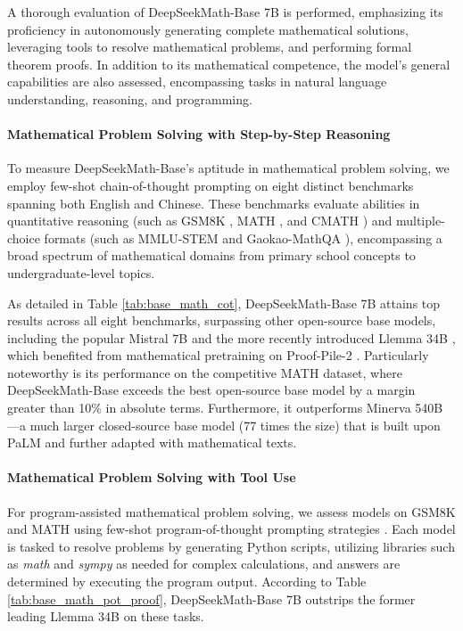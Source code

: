 A thorough evaluation of DeepSeekMath-Base 7B is performed, emphasizing its proficiency in autonomously generating complete mathematical solutions, leveraging tools to resolve mathematical problems, and performing formal theorem proofs. In addition to its mathematical competence, the model’s general capabilities are also assessed, encompassing tasks in natural language understanding, reasoning, and programming.

\paragraph{Mathematical Problem Solving with Step-by-Step Reasoning}

To measure DeepSeekMath-Base's aptitude in mathematical problem solving, we employ few-shot chain-of-thought prompting \citep{cot} on eight distinct benchmarks spanning both English and Chinese. These benchmarks evaluate abilities in quantitative reasoning (such as GSM8K \citep{gsm8k}, MATH \citep{MATH}, and CMATH \citep{wei2023cmath}) and multiple-choice formats (such as MMLU-STEM \citep{mmlu} and Gaokao-MathQA \citep{agieval}), encompassing a broad spectrum of mathematical domains from primary school concepts to undergraduate-level topics.

As detailed in Table \ref{tab:base_math_cot}, DeepSeekMath-Base 7B attains top results across all eight benchmarks, surpassing other open-source base models, including the popular Mistral 7B \citep{mistral} and the more recently introduced Llemma 34B \citep{llemma}, which benefited from mathematical pretraining on Proof-Pile-2 \citep{llemma}. Particularly noteworthy is its performance on the competitive MATH dataset, where DeepSeekMath-Base exceeds the best open-source base model by a margin greater than 10\% in absolute terms. Furthermore, it outperforms Minerva 540B \citep{minerva}—a much larger closed-source base model (77 times the size) that is built upon PaLM \citep{palm} and further adapted with mathematical texts.

\paragraph{Mathematical Problem Solving with Tool Use}  
For program-assisted mathematical problem solving, we assess models on GSM8K and MATH using few-shot program-of-thought prompting strategies \citep{pot,pal}. Each model is tasked to resolve problems by generating Python scripts, utilizing libraries such as \textit{math} and \textit{sympy} as needed for complex calculations, and answers are determined by executing the program output. According to Table \ref{tab:base_math_pot_proof}, DeepSeekMath-Base 7B outstrips the former leading Llemma 34B on these tasks.

